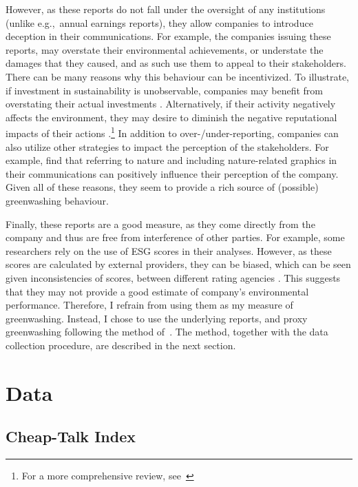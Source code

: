\documentclass[12pt]{article}
\begin{document}
However, as these reports do not fall under the oversight of any institutions (unlike e.g.,~annual earnings reports), they allow companies to introduce deception in their communications. For example, the companies issuing these reports, may overstate their environmental achievements, or understate the damages that they caused, and as such use them to appeal to their stakeholders. There can be many reasons why this behaviour can be incentivized. To illustrate, if investment in sustainability is unobservable, companies may benefit from overstating their actual investments \parencite{wuBadGreenwashingGood2020}. Alternatively, if their activity negatively affects the environment, they may desire to diminish the negative reputational impacts of their actions \parencite{marquisScrutinyNormsSelective2016, binglerCheapTalkCherrypicking2022}.\footnote{For a more comprehensive review, see~\cite{kimGreenwashVsBrownwash2015}} In addition to over-/under-reporting, companies can also utilize other strategies to impact the perception of the stakeholders. For example, \textcite{parguelCanEvokingNature2015,schmuckMisleadingConsumersGreen2018} find that referring to nature and including nature-related graphics in their communications can positively influence their perception of the company. Given all of these reasons, they seem to provide a rich source of (possible) greenwashing behaviour.


Finally, these reports are a good measure, as they come directly from the company and thus are free from interference of other parties. For example, some researchers rely on the use of ESG scores in their analyses. However, as these scores are calculated by external providers, they can be biased, which can be seen given inconsistencies of scores, between different rating agencies \parencite{bergAggregateConfusionDivergence2022, chatterjiRatingsFirmsConverge2016}. This suggests that they may not provide a good estimate of company's environmental performance. Therefore, I refrain from using them as my measure of greenwashing. Instead, I chose to use the underlying reports, and proxy greenwashing following the method of~\cite{binglerHowCheapTalk2024}. The method, together with the data collection procedure, are described in the next section.


\section{Data}\label{sect:data}

\subsection{Cheap-Talk Index}
\end{document}
